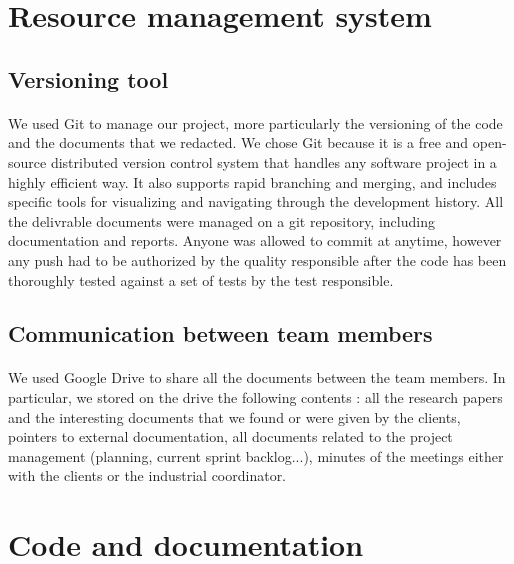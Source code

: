 \documentclass{report}
\begin{document}
\section{Resource management system}

\subsection{Versioning tool}

\paragraph{}
\hspace{4mm}We used Git to manage our project, more particularly the versioning of the code
and the documents that we redacted. We chose Git because it is a free and open-source
 distributed version control system that handles any software 
project in a highly efficient way. It also supports rapid branching and merging, 
and includes specific tools for visualizing and 
navigating through the development history.
All the delivrable documents were managed on a git repository, including documentation and reports. 
Anyone was allowed to commit at anytime, however any push had to be authorized by the quality responsible after the code has been thoroughly tested against a 
set of tests by the test responsible.

\subsection{Communication between team members}

\paragraph{}
\hspace{4mm}We used Google Drive to share all the documents 
between the team members.
 In particular, we stored on the drive the following contents :
all the research papers and the interesting documents
 that we found or were given by the clients, pointers to external documentation,
all documents related to the project management (planning, current sprint backlog...),
minutes of the meetings either with 
the clients or the industrial coordinator.

\section{Code and documentation}
\end{document}
